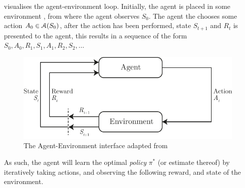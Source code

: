 
\vspace*{1em}

 visualises the agent-environment loop. 
Initially, the agent is placed in some environment , from where the agent observes $S_0$.
The agent the chooses some action $A_0 \in \mathcal{A}(S_0)$, after the action has been performed, state $S_{t+1}$ and $R_t$ is presented to the agent, this results in a sequence of the form $S_0,A_0,R_1,S_1,A_1,R_2,S_2,\ldots$

\begin{figure}[!htb]
    \centering
    \includegraphics[scale=1]{../include/agent-environment-loop.pdf}
    \caption{The Agent-Environment interface adapted from \citet[chap. 3]{RLBook2018}}
    \label{fig:agent-environment}
\end{figure}

As such, the agent will learn the optimal \textit{policy} $\pi^*$ (or estimate thereof) by iteratively taking actions, and observing the following reward, and state of the environment.



